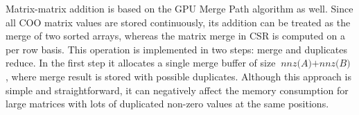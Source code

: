 Matrix-matrix addition is based on the GPU Merge Path algorithm as well.
Since all COO matrix values are stored continuously, 
its addition can be treated as the merge of two sorted arrays, 
whereas the matrix merge in CSR is computed on a per row basis. 
This operation is implemented in two steps: merge and duplicates reduce. 
In the first step it allocates a single merge buffer of size $\textit{nnz(A)} + \textit{nnz(B)}$, 
where merge result is stored with possible duplicates. 
Although this approach is simple and straightforward, it can negatively affect the memory consumption for large matrices with lots of duplicated non-zero values at the same positions.
